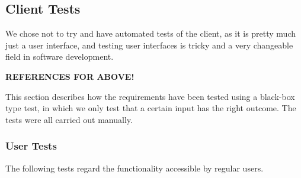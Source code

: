 \subsection{Client Tests}

We
chose not to try and have automated tests of the client, as it is pretty much
just a user interface, and testing user interfaces is tricky and a very
changeable field in software development.

\textbf{REFERENCES FOR ABOVE!}

This section describes how the requirements have been tested using a black-box type test, in which we only test that a certain input has the right outcome. The tests were all carried out manually.

\subsubsection{User Tests}
The following tests regard the functionality accessible by regular users. \\
